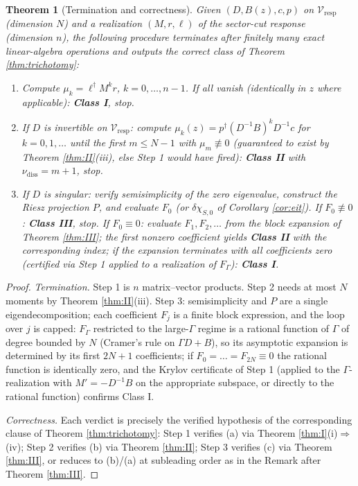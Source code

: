 \documentclass[11pt]{article}
\newtheorem{theorem}{Theorem}
\newcommand{\Vresp}{\mathcal V_{\mathrm{resp}}}
\newcommand{\nudiss}{\nu_{\mathrm{diss}}}
\begin{document}
\begin{theorem}[Termination and correctness]
\label{thm:algorithm}
Given $(D,B(z),c,p)$ on $\Vresp$ (dimension $N$) and a realization
$(M,r,\ell)$ of the sector-cut response (dimension $n$), the following
procedure terminates after finitely many exact linear-algebra operations and
outputs the correct class of Theorem \ref{thm:trichotomy}:
\begin{enumerate}[label=\textbf{Step \arabic*.},leftmargin=5em,nosep]
\item Compute $\mu_k=\ell^\dagger M^kr$, $k=0,\dots,n-1$. If all vanish
      (identically in $z$ where applicable): \textbf{Class I}, stop.
\item If $D$ is invertible on $\Vresp$: compute
      $\mu_k(z)=p^\dagger(D^{-1}B)^kD^{-1}c$ for $k=0,1,\dots$ until the
      first $m\le N-1$ with $\mu_m\not\equiv0$ (guaranteed to exist by
      Theorem \ref{thm:II}(iii), else Step 1 would have fired):
      \textbf{Class II} with $\nudiss=m+1$, stop.
\item If $D$ is singular: verify semisimplicity of the zero eigenvalue,
      construct the Riesz projection $P$, and evaluate $F_0$
      (or $\delta\chi_{S,0}$ of Corollary \ref{cor:eit}). If
      $F_0\not\equiv0$: \textbf{Class III}, stop. If $F_0\equiv0$: evaluate
      $F_1,F_2,\dots$ from the block expansion of Theorem \ref{thm:III};
      the first nonzero coefficient yields \textbf{Class II} with the
      corresponding index; if the expansion terminates with all coefficients
      zero (certified via Step 1 applied to a realization of $F_\Gamma$):
      \textbf{Class I}.
\end{enumerate}
\end{theorem}

\begin{proof}
\emph{Termination.} Step 1 is $n$ matrix--vector products. Step 2 needs at
most $N$ moments by Theorem \ref{thm:II}(iii). Step 3: semisimplicity and $P$
are a single eigendecomposition; each coefficient $F_j$ is a finite block
expression, and the loop over $j$ is capped: $F_\Gamma$ restricted to the
large-$\Gamma$ regime is a rational function of $\Gamma$ of degree bounded by
$N$ (Cramer's rule on $\Gamma D+B$), so its asymptotic expansion is
determined by its first $2N+1$ coefficients; if $F_0=\dots=F_{2N}\equiv0$ the
rational function is identically zero, and the Krylov certificate of Step 1
(applied to the $\Gamma$-realization with $M'=-D^{-1}B$ on the appropriate
subspace, or directly to the rational function) confirms Class I.

\emph{Correctness.} Each verdict is precisely the verified hypothesis of the
corresponding clause of Theorem \ref{thm:trichotomy}: Step 1 verifies (a) via
Theorem \ref{thm:I}(i)$\Rightarrow$(iv); Step 2 verifies (b) via Theorem
\ref{thm:II}; Step 3 verifies (c) via Theorem \ref{thm:III}, or reduces to
(b)/(a) at subleading order as in the Remark after Theorem \ref{thm:III}.
\end{proof}
\end{document}
